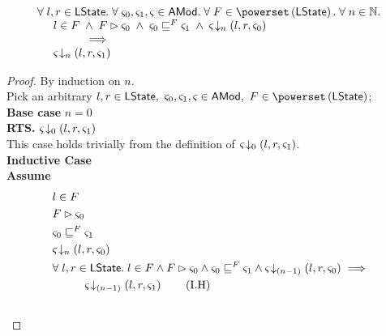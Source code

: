 %
%
\begin{lemma}[] \label{lem:amodHiding}
%
\[
\begin{array}{l}
	\for{l, r \in \LState} \for{\amod{0}, \amod{1}, \amod{} \in \AMods} \for{ F \in \pset{\LState}} \for{n \in \Nats} \\
	
	\hspace*{0.5cm} 
	l \in F \;\land\; 
	F \fences \amod{0} \;\land\; 
	\amod{0} \weakenI{F} \amod{1}\;\land\;
	\extendsAMUpto{\amod{}}{n}{l}{r}{\amod{0}}\\
	
	\hspace*{1.5cm} \implies\\
	
	
	\hspace*{0.5cm}
	\extendsAMUpto{\amod{}}{n}{l}{r}{\amod{1}}\\
\end{array}
\]
%
\begin{proof}
By induction on $n$. \\
Pick an arbitrary $l, r \in \LState,\ \amod{0}, \amod{1}, \amod{} \in \AMods,\  F \in \pset{\LState}$;\\
\noindent\textbf{Base case} $n = 0$\\
\textbf{RTS. } $\varsigma_{} \!\downarrow_{0} \left(l, r, \varsigma_{1}\right)$\\
This case holds trivially from the definition of $\varsigma_{} \!\downarrow_{0} \left(l, r, \varsigma_{1}\right)$.\\

\noindent\textbf{Inductive Case}\\
\textbf{Assume}
\begin{align}
	&l \in F \label{L2:Ass1}\\
	&F \fences \amod{0} \label{L2:Ass2}\\
	&\amod{0} \weakenI{F} \amod{1}\label{L2:Ass4}\\
	& \extendsAMUpto{\amod{}}{n}{l}{r}{\amod{0}} \label{L2:Ass5}\\
%
	&\for{l, r \in \LState} l \in F \land F \fences \amod{0} \land \amod{0} \weakenI{F} \amod{1} \land \extendsAMUpto{\amod{}}{(n-1)}{l}{r}{\amod{0}}
	\implies \nonumber\\
	&\hspace*{1cm}\extendsAMUpto{\amod{}}{(n-1)}{l}{r}{\amod{1}} \tag{I.H}\label{L2:I.H}\\\nonumber
\end{align}


\end{proof}
\end{lemma}
